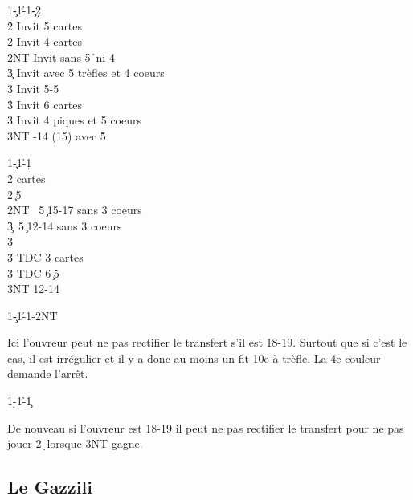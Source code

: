 \documentclass[a4paper]{article}
\begin{document}
\begin{bidtable}
1\c-1\h-1\c-2\d\+\\
2\h \> Invit 5 cartes\\
2\s \> Invit 4 cartes\\
2NT \> Invit sans 5\h\ ni 4\s \\
3\c \> Invit avec 5 trèfles et 4 coeurs\\
3\d \> Invit 5-5\\
3\h \> Invit 6 cartes\\
3\s \> Invit 4 piques et 5 coeurs\\
3NT -14 (15) avec 5\h \-
\end{bidtable}

\begin{bidtable}
1\c-1\h-1\d\+\\
2\h {} cartes\\
2\s {}\c\ 5\s \\
2NT \s\ 5\c\ 15-17 sans 3 coeurs\\
3\c {}\s\ 5\c\ 12-14 sans 3 coeurs\\
3\d {}\\
3\h \> TDC 3 cartes\\
3\s \> TDC 6\c\ 5\s \\
3NT  12-14\-
\end{bidtable}

\begin{bidtable}
1\c-1\h-1\s-2NT
\end{bidtable}

Ici l'ouvreur peut ne pas rectifier le transfert s'il est 18-19. Surtout que si c'est le cas, il est irrégulier
et il y a donc au moins un fit 10e à trèfle. La 4e couleur demande l'arrêt.

\begin{bidtable}
1\d-1\h-1\c
\end{bidtable}

De nouveau si l'ouvreur est 18-19 il peut ne pas rectifier le transfert pour ne pas jouer 2\d\ lorsque 3NT gagne.

\subsection{Le Gazzili}
\end{document}

